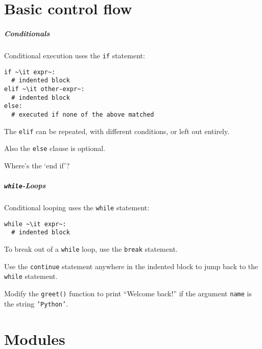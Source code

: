 \documentclass[english,serif,mathserif,xcolor=pdftex,dvipsnames,table]{beamer}
\begin{document}
\part{Basic control flow}
\begin{frame}[fragile]
  \frametitle{Conditionals}
  Conditional execution uses the \texttt{if} statement:
\begin{lstlisting}
if ~\it expr~:
  # indented block
elif ~\it other-expr~:
  # indented block
else:
  # executed if none of the above matched
\end{lstlisting}

  \+The \texttt{elif} can be repeated, with different conditions, or
  left out entirely.

  \+
  Also the \texttt{else} clause is optional.

  \+
  \begin{question}
    Where's the `end if'?

  \end{question}
\end{frame}


\begin{frame}[fragile]
  \frametitle{\texttt{while}-Loops}
  Conditional looping uses the \texttt{while} statement:
\begin{lstlisting}
while ~\it expr~:
  # indented block
\end{lstlisting}

  \+
  To break out of a \texttt{while} loop, use the \texttt{break}
  statement.

  \+
  Use the \texttt{continue} statement anywhere in the indented
  block to jump back to the \texttt{while} statement.


\end{frame}


\begin{frame}
  \begin{exercise*}[2.C]
    Modify the \texttt{greet()} function to print ``Welcome back!'' if the
    argument \texttt{name} is the string \texttt{'Python'}.
  \end{exercise*}
\end{frame}


\part{Modules}
\end{document}

